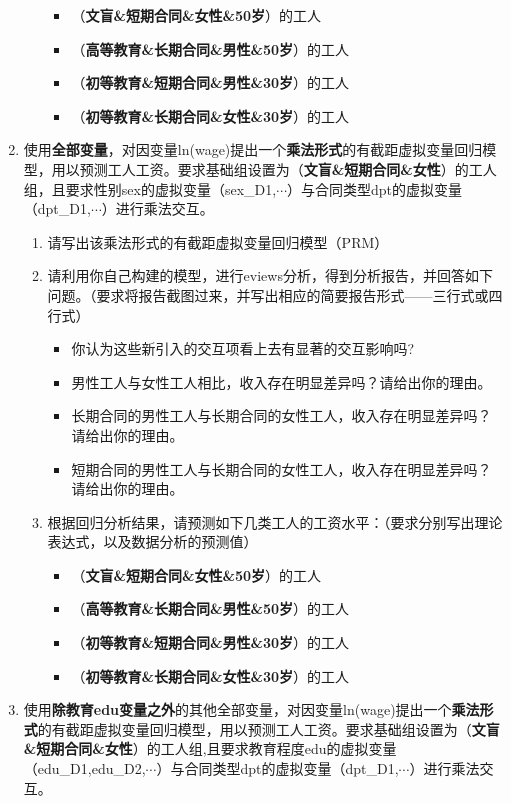 \documentclass[12pt,(landscape,a4paper),(portrait,a4paper)]{article}
\providecommand{\tightlist}{%
  \setlength{\itemsep}{0pt}\setlength{\parskip}{0pt}}
\theoremstyle{definition}
\theoremstyle{definition}
\theoremstyle{definition}
\theoremstyle{remark}
\begin{document}
\begin{enumerate}
\begin{enumerate}
    \begin{itemize}
    \tightlist
    \item
      （\textbf{文盲\&短期合同\&女性\&50岁}）的工人
    \item
      （\textbf{高等教育\&长期合同\&男性\&50岁}）的工人
    \item
      （\textbf{初等教育\&短期合同\&男性\&30岁}）的工人
    \item
      （\textbf{初等教育\&长期合同\&女性\&30岁}）的工人
    \end{itemize}
  \end{enumerate}
\item
  使用\textbf{全部变量}，对因变量ln(wage)提出一个\textbf{乘法形式}的有截距虚拟变量回归模型，用以预测工人工资。要求基础组设置为（\textbf{文盲\&短期合同\&女性}）的工人组，且要求性别sex的虚拟变量（sex\_D1,\(\cdots\)）与合同类型dpt的虚拟变量（dpt\_D1,\(\cdots\)）进行乘法交互。

  \begin{enumerate}
  \def\labelenumii{\alph{enumii}.}
  \tightlist
  \item
    请写出该乘法形式的有截距虚拟变量回归模型（PRM）
  \item
    请利用你自己构建的模型，进行eviews分析，得到分析报告，并回答如下问题。（要求将报告截图过来，并写出相应的简要报告形式------三行式或四行式）

    \begin{itemize}
    \tightlist
    \item
      你认为这些新引入的交互项看上去有显著的交互影响吗?
    \item
      男性工人与女性工人相比，收入存在明显差异吗？请给出你的理由。
    \item
      长期合同的男性工人与长期合同的女性工人，收入存在明显差异吗？请给出你的理由。
    \item
      短期合同的男性工人与长期合同的女性工人，收入存在明显差异吗？请给出你的理由。
    \end{itemize}
  \item
    根据回归分析结果，请预测如下几类工人的工资水平：（要求分别写出理论表达式，以及数据分析的预测值）

    \begin{itemize}
    \tightlist
    \item
      （\textbf{文盲\&短期合同\&女性\&50岁}）的工人
    \item
      （\textbf{高等教育\&长期合同\&男性\&50岁}）的工人
    \item
      （\textbf{初等教育\&短期合同\&男性\&30岁}）的工人
    \item
      （\textbf{初等教育\&长期合同\&女性\&30岁}）的工人
    \end{itemize}
  \end{enumerate}
\item
  使用\textbf{除教育edu变量之外}的其他全部变量，对因变量ln(wage)提出一个\textbf{乘法形式}的有截距虚拟变量回归模型，用以预测工人工资。要求基础组设置为（\textbf{文盲\&短期合同\&女性}）的工人组,且要求教育程度edu的虚拟变量（edu\_D1,edu\_D2,\(\cdots\)）与合同类型dpt的虚拟变量（dpt\_D1,\(\cdots\)）进行乘法交互。


\end{enumerate}
\end{document}
